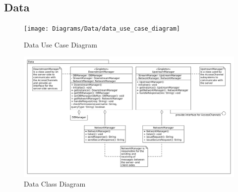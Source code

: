 \documentclass[11pt]{article}
\begin{document}
	\subsection{Data}
	\begin{figure}[!h]
        \centering
        \texttt{[image: Diagrams/Data/data\_use\_case\_diagram]}
        \caption{Data Use Case Diagram}
        \label{fig:data_use_case}
    \end{figure}
    \begin{figure}[!h]
        \centering
        \includegraphics[width=\textwidth]{Diagrams/Data/data_class_diagram}
        \caption{Data Class Diagram}
        \label{fig:data_class}
    \end{figure}
\end{document}
